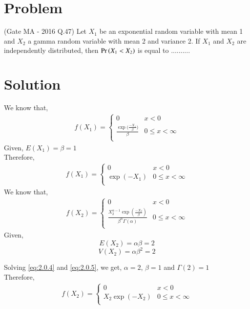 \documentclass[journal,12pt,twocolumn]{IEEEtran}
\begin{document}
\section{Problem}
(Gate MA - 2016 Q.47) Let $X_{1}$ be	an	exponential	random	variable with mean 1 and $X_{2}$ a gamma	random variable	with mean 2	and	variance 2.	If $X_{1}$ and $X_{2}$ are independently	distributed, then $\Pr\left(X_1 < X_2\right)$ is equal	to ..........	
\section{Solution}
We know that,
\begin{align}
    f(X_1) = 
    \begin{cases}
    0   & x < 0\\
    \frac{\exp{(\frac{{-X_1}}{\beta}})}{\beta} & 0\le x < \infty\\
    \end{cases}
\end{align}
Given, $E(X_1)=\beta=1$\\
Therefore,
\begin{align}
    f(X_1) = 
    \begin{cases}
    0   & x < 0\\
    \exp{(-X_1)} & 0\le x < \infty\\
    \end{cases}
\end{align}
We know that,
\begin{align}
    f(X_2) = 
    \begin{cases}
    0   & x < 0\\
    \frac{X_{2}^{\alpha-1}\exp{(\frac{-X_2}{\beta})}}{\beta^{\alpha}\Gamma(\alpha)} & 0\le x < \infty\\
    \end{cases}
\end{align}
Given, 
\begin{equation}\label{eq:2.0.4}
    E(X_2)=\alpha \beta =2 
\end{equation}
\begin{equation}\label{eq:2.0.5}
    V(X_2)=\alpha \beta^{2}=2 
\end{equation}

Solving \ref{eq:2.0.4} and \ref{eq:2.0.5}, we get,
$\alpha=2$, $\beta=1$ and $\Gamma(2)=1$\\
Therefore,
\begin{align}
    f(X_2) = 
    \begin{cases}
    0   & x < 0\\
    X_2\exp{(-X_2)} & 0\le x < \infty\\
    \end{cases}
\end{align}
\end{document}
